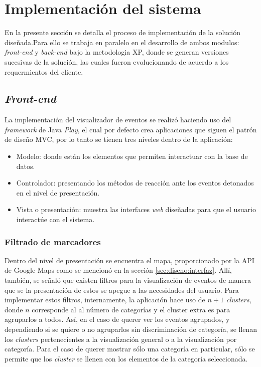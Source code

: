 \section{Implementación del sistema}
\label{sec:implementacion}

En la presente sección se detalla el proceso de implementación de la solución diseñada.Para ello se trabaja en paralelo en el desarrollo de ambos modulos: \textit{front-end} y \textit{back-end} bajo la metodologia XP, donde se generan versiones sucesivas de la solución, las cuales fueron evolucionando de acuerdo a los requermientos del cliente.

\subsection{\textit{Front-end}}
\label{subsec:imp:visualizador}

La implementación del visualizador de eventos se realizó haciendo uso del \textit{framework} de Java \textit{Play}, el cual por defecto crea aplicaciones que siguen el patrón de diseño MVC, por lo tanto se tienen tres niveles dentro de la aplicación:

\begin{itemize}
\item Modelo: donde están los elementos que permiten interactuar con la base de datos. 
\item Controlador: presentando los métodos de reacción ante los eventos detonados en el nivel de presentación.
\item Vista o presentación: muestra las interfaces \textit{web} diseñadas para que el usuario interactúe con el sistema.
\end{itemize}

\subsubsection*{Filtrado de marcadores}
\label{subsubsec:filtradoMarcadores}

Dentro del nivel de presentación se encuentra el mapa, proporcionado por la API de Google Maps como se mencionó en la sección \ref{sec:diseno:interfaz}. Allí, también, se señaló que existen filtros para la visualización de eventos de manera que se la presentación de estos se apegue a las necesidades del usuario. Para implementar estos filtros, internamente, la aplicación hace uso de $n + 1$ \textit{clusters}, donde $n$ corresponde al al número de categorías y el cluster extra es para agruparlos a todos. Así, en el caso de querer ver los eventos agrupados, y dependiendo si se quiere o no agruparlos sin discriminación de categoría, se llenan los \textit{clusters} pertenecientes a la visualización general o a la visualización por categoría. Para el caso de querer mostrar sólo una categoría en particular, sólo se permite que los \textit{cluster} se llenen con los elementos de la categoría seleccionada.


